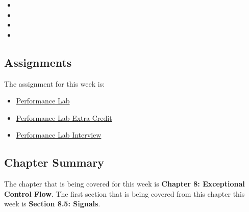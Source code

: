 \begin{itemize}
    \item {}
    \item {}
    \item {}
    \item {}
\end{itemize}

\subsection{Assignments}

The assignment for this week is:

\begin{itemize}
    \item \href{https://github.com/QuantumCompiler/CU/tree/main/CSPB%202400%20-%20Computer%20Systems/CSPB%202400%20-%20Assignments/CSPB%202400%20-%20Assignment%204%20-%20Performance%20Lab}{Performance Lab}
    \item \href{https://github.com/QuantumCompiler/CU/tree/main/CSPB%202400%20-%20Computer%20Systems/CSPB%202400%20-%20Assignments/CSPB%202400%20-%20Assignment%204%20-%20Performance%20Lab}{Performance Lab Extra Credit}
    \item \href{https://github.com/QuantumCompiler/CU/tree/main/CSPB%202400%20-%20Computer%20Systems/CSPB%202400%20-%20Assignments/CSPB%202400%20-%20Assignment%204%20-%20Performance%20Lab}{Performance Lab Interview}
\end{itemize}

\subsection{Chapter Summary}

The chapter that is being covered for this week is \textbf{Chapter 8: Exceptional Control Flow}. The first section that is being covered from this chapter this week is \textbf{Section 8.5: Signals}.

